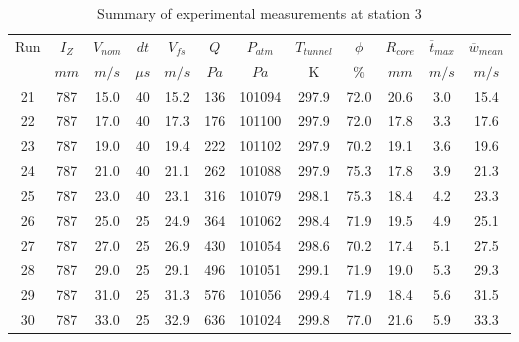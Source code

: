 \begin{table}[H]
\begin{center}
\begin{tabular}{|cccccccccccc|}
	\hline
	Run & $I_Z$ & $V_{nom}$ & $dt$ & $V_{fs}$ & $Q$ & $P_{atm}$ & $T_{tunnel}$ & $\phi$ & $R_{core}$ & $\overline{t}_{max}$ & $\overline{w}_{mean}$\\
	  & $mm$ & $m/s$ & $\mu s$ & $m/s$ & $Pa$ & $Pa$ & K & $\%$ & $mm$ & $m/s$ & $m/s$\\
	\hline
	21 & 787 & 15.0 & 40 & 15.2 & 136 & 101094 & 297.9 & 72.0 & 20.6 & 3.0 & 15.4\\
	22 & 787 & 17.0 & 40 & 17.3 & 176 & 101100 & 297.9 & 72.0 & 17.8 & 3.3 & 17.6\\
	23 & 787 & 19.0 & 40 & 19.4 & 222 & 101102 & 297.9 & 70.2 & 19.1 & 3.6 & 19.6\\
	24 & 787 & 21.0 & 40 & 21.1 & 262 & 101088 & 297.9 & 75.3 & 17.8 & 3.9 & 21.3\\
	25 & 787 & 23.0 & 40 & 23.1 & 316 & 101079 & 298.1 & 75.3 & 18.4 & 4.2 & 23.3\\
	26 & 787 & 25.0 & 25 & 24.9 & 364 & 101062 & 298.4 & 71.9 & 19.5 & 4.9 & 25.1\\
	27 & 787 & 27.0 & 25 & 26.9 & 430 & 101054 & 298.6 & 70.2 & 17.4 & 5.1 & 27.5\\
	28 & 787 & 29.0 & 25 & 29.1 & 496 & 101051 & 299.1 & 71.9 & 19.0 & 5.3 & 29.3\\
	29 & 787 & 31.0 & 25 & 31.3 & 576 & 101056 & 299.4 & 71.9 & 18.4 & 5.6 & 31.5\\
	30 & 787 & 33.0 & 25 & 32.9 & 636 & 101024 & 299.8 & 77.0 & 21.6 & 5.9 & 33.3\\
	\hline
\end{tabular}
\caption{Summary of experimental measurements at station 3}
\label{table:experiment_results_3}
\end{center}
\end{table}
